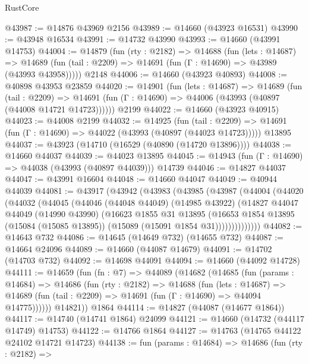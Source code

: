 \begin{lexlean}{RustCore}
\begin{coremodule}
@43987 := @14876 @43969 @2156
@43989 := @14660 (@43923 @16531)
@43990 := @43948 @16534
@43991 := @14732 @43990
@43993 := @14660 (@43991 @14753)
@44004 := @14879
    (fun (rty : @2182) =>
    @14688
      (fun (lets : @14687) =>
      @14689 (fun (tail : @2209) => @14691 (fun (Γ : @14690) => @43989 (@43993 @43958)))))
    @2148
@44006 := @14660 (@43923 @40893)
@44008 := @40898 @43953 @23859
@44020 := @14901
    (fun (lets : @14687) =>
    @14689
      (fun (tail : @2209) =>
      @14691 (fun (Γ : @14690) => @44006 (@43993 (@40897 (@44008 @14721 @14723))))))
    @2199
@44022 := @14660 (@43923 @40915)
@44023 := @44008 @2199
@44032 := @14925
    (fun (tail : @2209) => @14691 (fun (Γ : @14690) => @44022 (@43993 (@40897 (@44023 @14723)))))
    @13895
@44037 := @43923 (@14710 (@16529 (@40890 (@14720 @13896))))
@44038 := @14660 @44037
@44039 := @44023 @13895
@44045 := @14943 (fun (Γ : @14690) => @44038 (@43993 (@40897 @44039))) @14739
@44046 := @14827 @44037
@44047 := @43991 @16604
@44048 := @14660 @44047
@44049 := @40944 @44039
@44081 := @43917
    (@43942
      (@43983
        (@43985
          (@43987
            (@44004
              (@44020
                (@44032
                  (@44045
                    (@44046
                      (@44048 @44049)
                      (@14985 @43922)
                      (@14827
                        @44047
                        @44049
                        (@14990 @43990)
                        (@16623
                          @1855
                          @31
                          @13895
                          (@16653
                            @1854
                            @13895
                            (@15084 (@15085 @13895))
                            (@15089 (@15091 @1854 @31))))))))))))))
@44082 := @14643 @732
@44086 := @14645 (@14649 @732) (@14655 @732)
@44087 := @14664 @24096
@44089 := @14660 (@44087 @14679)
@44091 := @14702 (@14703 @732)
@44092 := @14698 @44091
@44094 := @14660 (@44092 @14728)
@44111 := @14659
    (fun (fn : @7) =>
    @44089
      (@14682
        (@14685
          (fun (params : @14684) =>
          @14686
            (fun (rty : @2182) =>
            @14688
              (fun (lets : @14687) =>
              @14689 (fun (tail : @2209) => @14691 (fun (Γ : @14690) => @44094 @14775))))))
        @14821))
    @1864
@44114 := @14827 (@44087 (@14677 @1864))
@44117 := @14740 (@14741 @1864) @24099
@44121 := @14660 (@14732 (@44117 @14749) @14753)
@44122 := @14766 @1864
@44127 := @14763 (@14765 @44122 @24102 @14721 @14723)
@44138 := fun (params : @14684) =>
  @14686
    (fun (rty : @2182) =>

\end{coremodule}
\end{lexlean}
